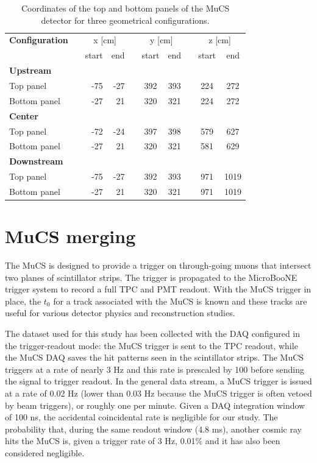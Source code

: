 \documentclass[a4paper]{scrartcl}
\renewcommand{\arraystretch}{1.2}
\newcommand{\ra}[1]{\renewcommand{\arraystretch}{#1}}
\begin{document}
\begin{table}[htbp]
  \centering
  \ra{1.2}
  \begin{tabular}{lcrrrccccc}
    \toprule
    \textbf{Configuration} & \phantom{abc}& \multicolumn{2}{c}{x [cm]} & \phantom{abc} & \multicolumn{2}{c}{y [cm]} & \phantom{abc} & \multicolumn{2}{c}{z [cm]}\\
    \cmidrule{3-4} \cmidrule{6-7} \cmidrule{9-10}
    & & start & end & & start & end & & start & end\\
    \midrule

    \textbf{Upstream} & & & & & & & & & \\
    Top panel & & -75 & -27 & & 392 & 393 & & 224 & 272\\
    Bottom panel & & -27 & 21 & & 320 & 321 & & 224 & 272\\

    \midrule
    \textbf{Center} & & & & & & & & & \\
    Top panel & & -72 & -24 & & 397 & 398 & & 579 & 627\\
    Bottom panel & & -27 & 21 & & 320 & 321 & & 581 & 629\\
    \midrule
    \textbf{Downstream} & & & & & & & & & \\
    Top panel & & -75 & -27 & & 392 & 393 & & 971 & 1019\\
    Bottom panel & & -27 & 21 & & 320 & 321 & & 971 & 1019\\
    \bottomrule

  \end{tabular}
  \caption{Coordinates of the top and bottom panels of the MuCS detector for three geometrical configurations.}\label{tab:mucs}
\end{table}


\section{MuCS merging}\label{sec:merging}
The MuCS is designed to provide a trigger on through-going muons that intersect two planes of scintillator strips. The trigger is propagated to the MicroBooNE trigger system to record a full TPC and PMT readout. With the MuCS trigger in place, the $t_0$ for a track associated with the MuCS is known and these tracks are useful for various detector physics and reconstruction studies.

The dataset used for this study has been collected with the DAQ configured in the trigger-readout mode: the MuCS trigger is sent to the TPC readout, while the MuCS DAQ saves the hit patterns seen in the scintillator strips.
The MuCS triggers at a rate of nearly 3 Hz and this rate is prescaled by 100 before sending the signal to trigger readout. In the general data stream, a MuCS trigger is issued at a rate of 0.02 Hz (lower than 0.03 Hz because the MuCS trigger is often vetoed by beam triggers), or roughly one per minute.
Given a DAQ integration window of 100 ns, the accidental coincidental rate is negligible for our study. The probability that, during the same readout window (4.8 ms), another cosmic ray hits the MuCS is, given a trigger rate of 3 Hz, 0.01\% and it has also been considered negligible.
\end{document}

